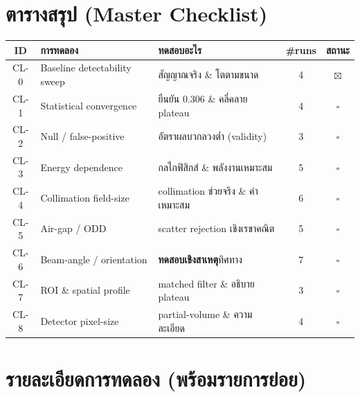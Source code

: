 \documentclass[14pt]{extarticle}
\newcommand{\todo}{\textcolor{theme}{$\square$}}
\newcommand{\done}{\textcolor{ok}{$\boxtimes$}}
\begin{document}
\section{ตารางสรุป (Master Checklist)}
\renewcommand{\arraystretch}{1.2}
\small
\begin{longtable}{c l l c c}
\rowcolor{theme}\color{white}\textbf{ID} & \color{white}\textbf{การทดลอง} &
  \color{white}\textbf{ทดสอบอะไร} & \color{white}\textbf{\#runs} & \color{white}\textbf{สถานะ} \\
\midrule
\endhead
CL-0 & Baseline detectability sweep & สัญญาณจริง \& โตตามขนาด & 4 & \done \\
\rowcolor{rowtint}
CL-1 & Statistical convergence & ยืนยัน 0.306 \& คลี่คลาย plateau & 4 & \todo \\
CL-2 & Null / false-positive & อัตราผลบวกลวงต่ำ (validity) & 3 & \todo \\
\rowcolor{rowtint}
CL-3 & Energy dependence & กลไกฟิสิกส์ \& พลังงานเหมาะสม & 5 & \todo \\
CL-4 & Collimation field-size & collimation ช่วยจริง \& ค่าเหมาะสม & 6 & \todo \\
\rowcolor{rowtint}
CL-5 & Air-gap / ODD & scatter rejection เชิงเรขาคณิต & 5 & \todo \\
CL-6 & Beam-angle / orientation & \textbf{ทดสอบเชิงสาเหตุ}ทิศทาง & 7 & \todo \\
\rowcolor{rowtint}
CL-7 & ROI \& spatial profile & matched filter \& อธิบาย plateau & 3 & \todo \\
CL-8 & Detector pixel-size & partial-volume \& ความละเอียด & 4 & \todo \\
\bottomrule
\end{longtable}
\normalsize

\section{รายละเอียดการทดลอง (พร้อมรายการย่อย)}
\end{document}

